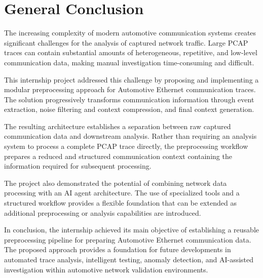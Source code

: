 \section{General Conclusion}

The increasing complexity of modern automotive communication systems creates significant challenges for the analysis of captured network traffic. Large PCAP traces can contain substantial amounts of heterogeneous, repetitive, and low-level communication data, making manual investigation time-consuming and difficult.

This internship project addressed this challenge by proposing and implementing a modular preprocessing approach for Automotive Ethernet communication traces. The solution progressively transforms communication information through event extraction, noise filtering and context compression, and final context generation.

The resulting architecture establishes a separation between raw captured communication data and downstream analysis. Rather than requiring an analysis system to process a complete PCAP trace directly, the preprocessing workflow prepares a reduced and structured communication context containing the information required for subsequent processing.

The project also demonstrated the potential of combining network data processing with an AI agent architecture. The use of specialized tools and a structured workflow provides a flexible foundation that can be extended as additional preprocessing or analysis capabilities are introduced.

In conclusion, the internship achieved its main objective of establishing a reusable preprocessing pipeline for preparing Automotive Ethernet communication data. The proposed approach provides a foundation for future developments in automated trace analysis, intelligent testing, anomaly detection, and AI-assisted investigation within automotive network validation environments.